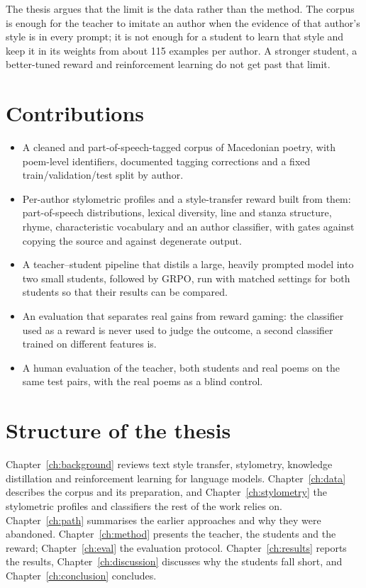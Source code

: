The thesis argues that the limit is the data rather than the method. The
corpus is enough for the teacher to imitate an author when the evidence of
that author's style is in every prompt; it is not enough for a student to
learn that style and keep it in its weights from about 115 examples per
author. A stronger student, a better-tuned reward and reinforcement learning
do not get past that limit.

\section{Contributions}

\begin{itemize}
  \item A cleaned and part-of-speech-tagged corpus of Macedonian poetry,
        with poem-level identifiers, documented tagging corrections and a
        fixed train/validation/test split by author.
  \item Per-author stylometric profiles and a style-transfer reward built
        from them: part-of-speech distributions, lexical diversity, line
        and stanza structure, rhyme, characteristic vocabulary and an
        author classifier, with gates against copying the source and
        against degenerate output.
  \item A teacher--student pipeline that distils a large, heavily prompted
        model into two small students, followed by GRPO, run with matched
        settings for both students so that their results can be compared.
  \item An evaluation that separates real gains from reward gaming: the
        classifier used as a reward is never used to judge the outcome,
        a second classifier trained on different features is.
  \item A human evaluation of the teacher, both students and real poems on
        the same test pairs, with the real poems as a blind control.
\end{itemize}

\section{Structure of the thesis}

Chapter~\ref{ch:background} reviews text style transfer, stylometry,
knowledge distillation and reinforcement learning for language models.
Chapter~\ref{ch:data} describes the corpus and its preparation, and
Chapter~\ref{ch:stylometry} the stylometric profiles and classifiers the
rest of the work relies on. Chapter~\ref{ch:path} summarises the earlier
approaches and why they were abandoned. Chapter~\ref{ch:method} presents the
teacher, the students and the reward; Chapter~\ref{ch:eval} the
evaluation protocol. Chapter~\ref{ch:results} reports the results,
Chapter~\ref{ch:discussion} discusses why the students fall short, and
Chapter~\ref{ch:conclusion} concludes.
